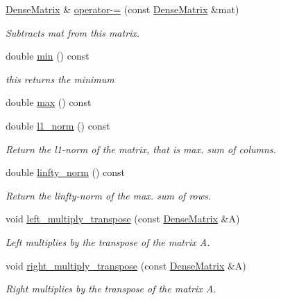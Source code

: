 \begin{DoxyCompactItemize}
\mbox{\hyperlink{classfemus_1_1_dense_matrix}{Dense\+Matrix}} \& \mbox{\hyperlink{classfemus_1_1_dense_matrix_a9e44e590645899830566d1dcb29b778f}{operator-\/=}} (const \mbox{\hyperlink{classfemus_1_1_dense_matrix}{Dense\+Matrix}} \&mat)
\begin{DoxyCompactList}\small\item\em Subtracts {\ttfamily mat} from this matrix. \end{DoxyCompactList}\item 
double \mbox{\hyperlink{classfemus_1_1_dense_matrix_a23726badca26256789e356c66a144727}{min}} () const
\begin{DoxyCompactList}\small\item\em this returns the minimum \end{DoxyCompactList}\item 
double \mbox{\hyperlink{classfemus_1_1_dense_matrix_a2226f9ae3cbf21779e203679b7cd00ff}{max}} () const
\item 
double \mbox{\hyperlink{classfemus_1_1_dense_matrix_a7ef19514a04f38ba1baf8d33b981651d}{l1\+\_\+norm}} () const
\begin{DoxyCompactList}\small\item\em Return the l1-\/norm of the matrix, that is max. sum of columns. \end{DoxyCompactList}\item 
double \mbox{\hyperlink{classfemus_1_1_dense_matrix_a4372d3ff30e801e9ef3333c0e48584cd}{linfty\+\_\+norm}} () const
\begin{DoxyCompactList}\small\item\em Return the linfty-\/norm of the max. sum of rows. \end{DoxyCompactList}\item 
void \mbox{\hyperlink{classfemus_1_1_dense_matrix_a87669df2d5c176037dc5f43d514e4294}{left\+\_\+multiply\+\_\+transpose}} (const \mbox{\hyperlink{classfemus_1_1_dense_matrix}{Dense\+Matrix}} \&A)
\begin{DoxyCompactList}\small\item\em Left multiplies by the transpose of the matrix {\ttfamily A}. \end{DoxyCompactList}\item 
void \mbox{\hyperlink{classfemus_1_1_dense_matrix_a1f37b788108a1c7667369141ee3686af}{right\+\_\+multiply\+\_\+transpose}} (const \mbox{\hyperlink{classfemus_1_1_dense_matrix}{Dense\+Matrix}} \&A)
\begin{DoxyCompactList}\small\item\em Right multiplies by the transpose of the matrix {\ttfamily A}. \end{DoxyCompactList}\item 

\end{DoxyCompactItemize}
